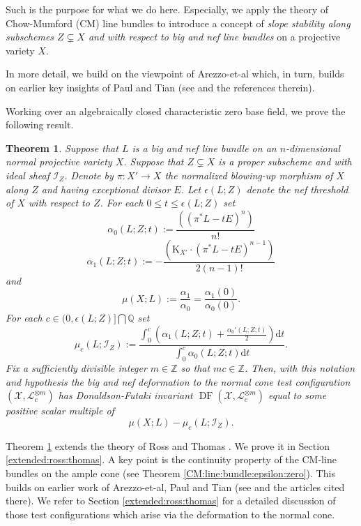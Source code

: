 \documentclass[12pt]{amsart}
\renewcommand{\leq}{\leqslant}
\newcommand{\K}{\mathrm{K}}
\newcommand{\Ish}{\mathcal{I}}
\newcommand{\QQ}{\mathbb{Q}} %
\newcommand{\ZZ}{\mathbb{Z}} %
\newtheorem{theorem}{Theorem}[section]
\theoremstyle{definition}
\numberwithin{equation}{section}
\begin{document}
Such is the purpose for what we do here.  Especially, we apply the theory of Chow-Mumford (CM) line bundles to introduce a concept of \emph{slope stability along subschemes $Z \subsetneq X$ and with respect to big and nef line bundles} on a projective variety $X$. 

 In more detail, we build on the viewpoint of Arezzo-et-al which, in turn, builds on earlier key insights of Paul and Tian (see \cite{Arezzo:DellaVedova:LaNave} and the references therein).  
 
Working over an algebraically closed characteristic zero base field, we prove the following result.

\begin{theorem}\label{Ross:Thomas:Slope:Stab:DF:intro}
Suppose that $L$ is a big and nef line bundle on an $n$-dimensional normal projective variety $X$.  Suppose that $Z \subsetneq X$ is a proper subscheme and with ideal sheaf $\Ish_Z$.  Denote by $\pi \colon X' \rightarrow X$ the normalized blowing-up morphism of $X$ along $Z$ and having exceptional divisor $E$.  Let $\epsilon(L;Z)$ denote the nef threshold of $X$ with respect to $Z$.  For each $0 \leq t \leq \epsilon(L;Z)$ set
\begin{equation}\label{alpha0}
\alpha_0(L;Z; t) := \frac{((\pi^*L - t E)^n )}{n!}
\end{equation}
\begin{equation}\label{alpha1}
\alpha_1(L;Z; t) := - \frac{(\K_{X'} \cdot(\pi^*L - t E)^{n-1})}{2(n-1)!}
\end{equation}
and
\begin{equation}\label{slope}
\mu(X;L) := \frac{\alpha_1}{\alpha_0} = \frac{\alpha_1(0)}{\alpha_0(0)} \text{.}
\end{equation}
For each 
$c \in (0, \epsilon(L;Z)] \bigcap \QQ$
set
$$
\mu_c(L;\Ish_Z) := \frac{ \int_0^c \left( \alpha_1(L;Z;t) + \frac{\alpha_0'(L;Z;t)}{2} \right) \mathrm{d}t }{ \int_0^c \alpha_0(L;Z;t) \mathrm{d}t } \text{.}
$$
Fix a sufficiently divisible integer $m \in \ZZ$ so that $mc \in \ZZ$.  Then, with this notation and hypothesis the big and nef deformation to the normal cone test configuration $(\mathcal{X}, \mathcal{L}_c^{\otimes m})$ has Donaldson-Futaki invariant $\operatorname{DF}(\mathcal{X},\mathcal{L}_c^{\otimes m})$ equal to some positive scalar multiple of 
$$\mu(X;L) - \mu_c(L;\Ish_Z) \text{.}$$
\end{theorem}

Theorem \ref{Ross:Thomas:Slope:Stab:DF:intro} extends the theory of Ross and Thomas \cite[Section 4]{Ross:Thomas:2007}.  We prove it in Section \ref{extended:ross:thomas}.  A key point is the continuity property of the CM-line bundles on the ample cone (see Theorem \ref{CM:line:bundle:epsilon:zero}).  This builds on earlier work of Arezzo-et-al, Paul and Tian (see \cite{Arezzo:DellaVedova:LaNave} and the articles cited there).  We refer to Section \ref{extended:ross:thomas} for a detailed discussion of those test configurations which arise via the deformation to the normal cone.
\end{document}
